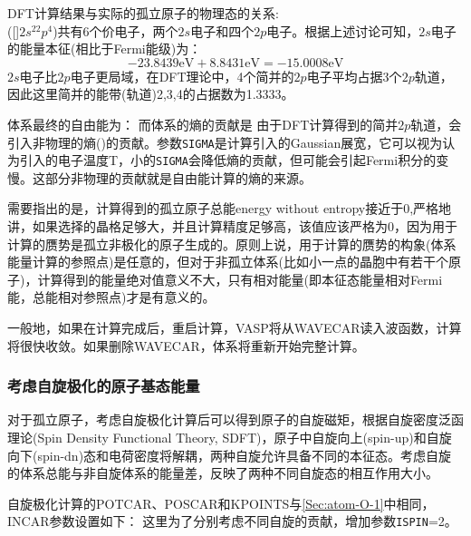 \textrm{DFT}计算结果与实际的孤立原子的物理态的关系:\\
([]$2s^22p^4$)共有6个价电子，两个$2s$电子和四个$2p$电子。根据上述讨论可知，$2s$电子的能量本征(相比于\textrm{Fermi}能级)为：
\begin{displaymath}
	-23.8439\mathrm{eV}+8.8431\mathrm{eV}=-15.0008\mathrm{eV}
\end{displaymath}
$2s$电子比$2p$电子更局域，在\textrm{DFT}理论中，4个简并的$2p$电子平均占据3个$2p$轨道，因此这里简并的能带(轨道)2,3,4的占据数为1.3333。

体系最终的自由能为：
{\fontsize{8.2pt}{6.2pt}\selectfont{
}}
而体系的熵的贡献是
{\fontsize{8.2pt}{6.2pt}\selectfont{
}}
由于\textrm{DFT}计算得到的简并$2p$轨道，会引入非物理的熵()的贡献。参数\texttt{SIGMA}是计算引入的\textrm{Gaussian}展宽，它可以视为认为引入的电子温度\textrm{T}，小的\texttt{SIGMA}会降低熵的贡献，但可能会引起\textrm{Fermi}积分的变慢。这部分非物理的贡献就是自由能计算的熵的来源。

需要指出的是，计算得到的孤立原子总能\textrm{energy without entropy}接近于0,严格地讲，如果选择的晶格足够大，并且计算精度足够高，该值应该严格为0，因为用于计算的赝势是孤立非极化的原子生成的。原则上说，用于计算的赝势的构象(体系能量计算的参照点)是任意的，但对于非孤立体系(比如小一点的晶胞中有若干个原子)，计算得到的能量绝对值意义不大，只有相对能量(即本征态能量相对\textrm{Fermi}能，总能相对参照点)才是有意义的。

一般地，如果在计算完成后，重启计算，\textrm{VASP}将从\textrm{WAVECAR}读入波函数，计算将很快收敛。如果删除\textrm{WAVECAR}，体系将重新开始完整计算。

\subsubsection{考虑自旋极化的原子基态能量}\label{Sec:atom-O-2}
对于孤立原子，考虑自旋极化计算后可以得到原子的自旋磁矩，根据自旋密度泛函理论\textrm{(Spin Density Functional Theory, SDFT)}，原子中自旋向上\textrm{(spin-up)}和自旋向下\textrm{(spin-dn)}态和电荷密度将解耦，两种自旋允许具备不同的本征态。考虑自旋的体系总能与非自旋体系的能量差，反映了两种不同自旋态的相互作用大小。

自旋极化计算的\textrm{POTCAR}、\textrm{POSCAR}和\textrm{KPOINTS}与\ref{Sec:atom-O-1}中相同，\textrm{INCAR}参数设置如下：
{\fontsize{8.2pt}{6.2pt}\selectfont{
}}
这里为了分别考虑不同自旋的贡献，增加参数\texttt{ISPIN}=2。

